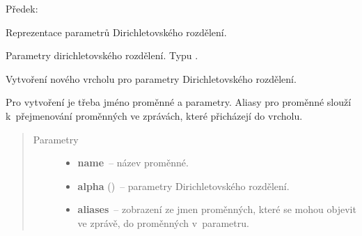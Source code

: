 \begin{fulllineitems}
\label{alex.infer:alex.infer.factor.alex.infer.node.DirichletParameterNode}
Předek: {\hyperref[alex.infer:alex.infer.factor.alex.infer.node.VariableNode]{}}

Reprezentace parametrů Dirichletovského rozdělení.

\begin{fulllineitems}
\label{alex.infer:alex.infer.factor.alex.infer.node.DirichletParameterNode.alpha}
Parametry dirichletovského rozdělení. Typu {\hyperref[alex.infer:alex.infer.factor.Factor]{}}.

\end{fulllineitems}


\begin{fulllineitems}
\label{alex.infer:alex.infer.factor.alex.infer.node.DirichletParameterNode.__init__}
Vytvoření nového vrcholu pro parametry Dirichletovského rozdělení.

Pro vytvoření je třeba jméno proměnné a parametry.
Aliasy pro proměnné slouží k~přejmenování proměnných ve zprávách, které
přicházejí do vrcholu.
\begin{quote}\begin{description}
\item[{Parametry}] \leavevmode\begin{itemize}
\item {} 
\textbf{name}~-- název proměnné.

\item {} 
\textbf{alpha} ({\hyperref[alex.infer:alex.infer.factor.Factor]{}})~-- parametry Dirichletovského rozdělení.

\item {} 
\textbf{aliases}~-- zobrazení ze jmen proměnných, které se mohou objevit ve zprávě, do proměnných v~parametru.

\end{itemize}

\end{description}\end{quote}


\end{fulllineitems}
\end{fulllineitems}
